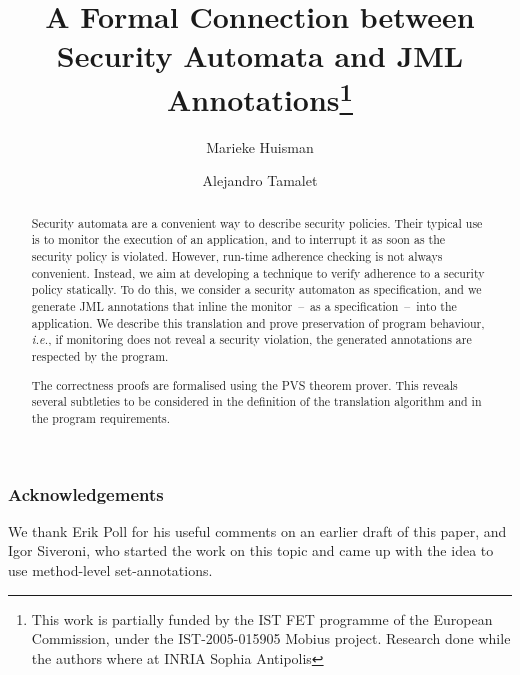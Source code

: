 \documentclass[]{llncs}
\title{A Formal Connection between Security Automata and JML
Annotations\thanks{This work is partially funded by the IST FET
programme of the European Commission, under the IST-2005-015905
\textsf{Mobius} project. Research done while the authors where at INRIA Sophia
Antipolis}}
\author{Marieke Huisman\inst{1}
 \and Alejandro Tamalet\inst{2}}
\institute{University of Twente, Netherlands \and
University of Nijmegen, Netherlands}
\begin{document}
\maketitle
\begin{abstract}
Security automata are a convenient way to describe security
policies. Their typical use is to monitor the execution of an
application, and to interrupt it as soon as the security policy is
violated. However, run-time adherence checking is not always
convenient. Instead, we aim at developing a technique to verify
adherence to a security policy statically.  To do this, we consider
a security automaton as specification, and we generate JML
annotations that inline the monitor~--~as a specification~--~into the
application.  We describe this translation and prove preservation of
program behaviour, \emph{i.e.}, if monitoring does not reveal a
security violation, the generated annotations are respected by the
program.

The correctness proofs are formalised using the PVS theorem prover.
This reveals several subtleties to be considered in the definition of the
translation algorithm and in the program requirements.
\end{abstract}












\subsubsection*{Acknowledgements}
We thank Erik Poll for his useful comments on an earlier draft of this
paper, and Igor Siveroni, who started the work on this topic and came
up with the idea to use method-level set-annotations.
\end{document}
